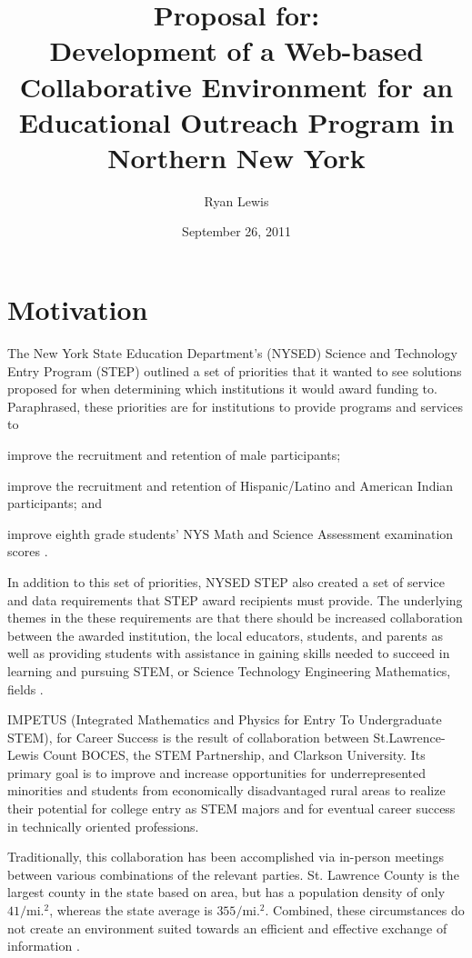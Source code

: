 \documentclass[11pt,letterpaper]{article}
\title{Proposal for:\\Development of a Web-based Collaborative Environment for an Educational Outreach Program in Northern New York}
\author{Ryan Lewis}
\date{September 26, 2011}
\begin{document}
\maketitle


\section{Motivation}

\begin{doublespacing}

The New York State Education Department's (NYSED) Science and Technology Entry Program (STEP) outlined a set of priorities that it wanted to see solutions proposed for when determining which institutions it would award funding to. Paraphrased, these priorities are for institutions to provide programs and services to
\begin{inparaenum}
\item improve the recruitment and retention of male participants;
\item improve the recruitment and retention of Hispanic/Latino and American Indian participants; and
\item improve eighth grade students' NYS Math and Science Assessment examination scores \cite{nys-step-op-manual}.
\end{inparaenum}

In addition to this set of priorities, NYSED STEP also created a set of service and data requirements that STEP award recipients must provide. The underlying themes in the these requirements are that there should be increased collaboration between the awarded institution, the local educators, students, and parents as well as providing students with assistance in gaining skills needed to succeed in learning and pursuing STEM, or Science Technology Engineering Mathematics, fields \cite{nys-step-op-manual}.

IMPETUS (Integrated Mathematics and Physics for Entry To Undergraduate STEM), for Career Success is the result of collaboration between St.Lawrence-Lewis Count BOCES, the STEM Partnership, and Clarkson University. Its primary goal is to improve and increase opportunities for underrepresented minorities and students from economically disadvantaged rural areas to realize their potential for college entry as STEM majors and for eventual career success in technically oriented professions.

Traditionally, this collaboration has been accomplished via in-person meetings between various combinations of the relevant parties. St. Lawrence County is the largest county in the state based on area, but has a population density of only $41/\mathrm{mi.}^2$, whereas the state average is $355/\mathrm{mi.}^2$. Combined, these circumstances do not create an environment suited towards an efficient and effective exchange of information \cite{nny-prism}.


\end{doublespacing}
\end{document}
